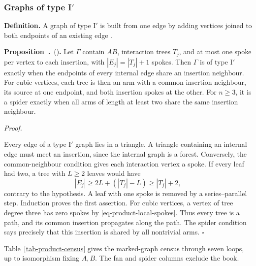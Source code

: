 \documentclass[11pt]{article}
\numberwithin{equation}{section}
\numberwithin{figure}{section}
\numberwithin{table}{section}
\newcounter{rthmc}[section]
\renewcommand{\therthmc}{\thesection.\arabic{rthmc}}
\newcommand{\rthm}[3]{\par\addvspace{\medskipamount}\noindent\refstepcounter{rthmc}\label{#2}\textbf{#1~\therthmc}\if\relax\detokenize{#3}\relax\else\ (#3)\fi\textbf{.}}
\begin{document}
\subsubsection{Graphs of type \texorpdfstring{I$'$}{I'}}\label{sec-B-typeI}

\textbf{Definition.} A graph of type I$\prime$ is built from one edge by adding vertices joined to both endpoints of an existing edge \cite[Definition 4.12]{GWW}.

\rthm{Proposition}{b-01345}{} Let $\Gamma$ contain $AB$, interaction trees $T_j$, and at most one spoke per vertex to each insertion, with $|E_j|=|T_j|+1$ spokes. Then $\Gamma$ is of type I$\prime$ exactly when the endpoints of every internal edge share an insertion neighbour. For cubic vertices, each tree is then an arm with a common insertion neighbour, its source at one endpoint, and both insertion spokes at the other. For $n\ge3$, it is a spider exactly when all arms of length at least two share the same insertion neighbour.

\begin{proofbox}
\emph{Proof.}

Every edge of a type I$\prime$ graph lies in a triangle. A triangle containing an internal edge must meet an insertion, since the internal graph is a forest. Conversely, the common-neighbour condition gives each interaction vertex a spoke. If every leaf had two, a tree with $L\ge2$ leaves would have
\begin{equation*}
|E_j|\ge2L+(|T_j|-L)\ge|T_j|+2,
\end{equation*}
contrary to the hypothesis. A leaf with one spoke is removed by a series--parallel step. Induction proves the first assertion. For cubic vertices, a vertex of tree degree three has zero spokes by \eqref{eq-product-local-spokes}. Thus every tree is a path, and its common insertion propagates along the path. The spider condition says precisely that this insertion is shared by all nontrivial arms. $\square$
\end{proofbox}

Table~\ref{tab-product-census} gives the marked-graph census through seven loops, up to isomorphism fixing $A,B$. The fan and spider columns exclude the book.
\end{document}
